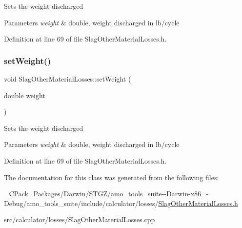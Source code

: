 Sets the weight discharged 
\begin{DoxyParams}{Parameters}
{\em weight} & double, weight discharged in lb/cycle \\
\hline
\end{DoxyParams}


Definition at line 69 of file Slag\+Other\+Material\+Losses.\+h.

\mbox{\label{class_slag_other_material_losses_a230a178f2ead59cd498b620e4bb4910f}} 
\subsubsection{\texorpdfstring{set\+Weight()}{setWeight()}\hspace{0.1cm}{\footnotesize\ttfamily [3/3]}}
{\footnotesize\ttfamily void Slag\+Other\+Material\+Losses\+::set\+Weight (\begin{DoxyParamCaption}\item[{double}]{weight }\end{DoxyParamCaption})\hspace{0.3cm}{\ttfamily [inline]}}

Sets the weight discharged 
\begin{DoxyParams}{Parameters}
{\em weight} & double, weight discharged in lb/cycle \\
\hline
\end{DoxyParams}


Definition at line 69 of file Slag\+Other\+Material\+Losses.\+h.



The documentation for this class was generated from the following files\+:\begin{DoxyCompactItemize}
\item 
\+\_\+\+C\+Pack\+\_\+\+Packages/\+Darwin/\+S\+T\+G\+Z/amo\+\_\+tools\+\_\+suite-\/-\/\+Darwin-\/x86\+\_-\/\+Debug/amo\+\_\+tools\+\_\+suite/include/calculator/losses/\hyperlink{___c_pack___packages_2_darwin_2_s_t_g_z_2amo__tools__suite--_darwin-x86__64-_debug_2amo__tools__a360f170cb779488bbc84e310d33960e}{Slag\+Other\+Material\+Losses.\+h}\item 
src/calculator/losses/Slag\+Other\+Material\+Losses.\+cpp\end{DoxyCompactItemize}

